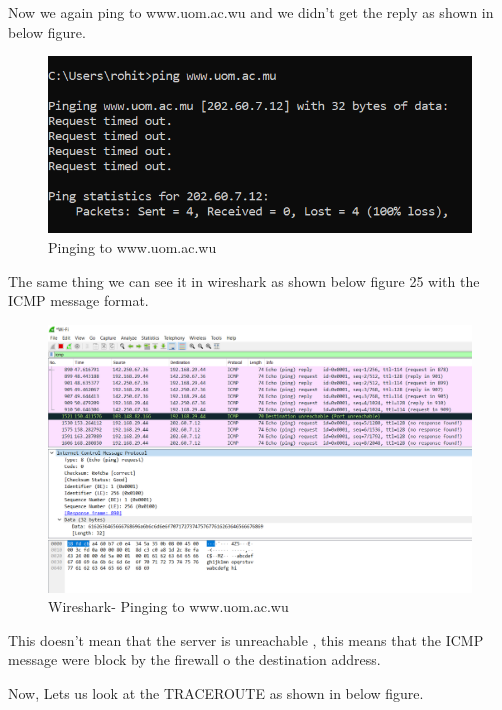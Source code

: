 \documentclass[12pt,a4paper]{article}
\begin{document}
Now we again ping to www.uom.ac.wu and we didn't get the reply as shown in below figure.

\begin{figure}[h]
 		\centering
				\includegraphics[scale=0.75]{6.8.png}	


			\caption{Pinging to www.uom.ac.wu}
			\label{fig:AP}
	\end{figure}

The same thing we can see it in wireshark as shown below figure 25 with the ICMP message format.
\pagebreak
\begin{figure}[h]
 		\centering
				\includegraphics[scale=0.3]{6.4.png}	


			\caption{Wireshark- Pinging to www.uom.ac.wu}
			\label{fig:AP}
	\end{figure}

This doesn't mean that the server is unreachable , this means that the ICMP message were block by the firewall o the destination address.

Now, Lets us look at the TRACEROUTE  as shown in below figure.
\end{document}
